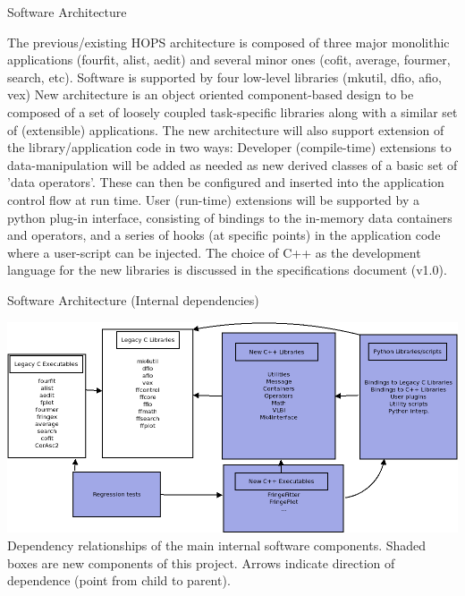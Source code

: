 \documentclass[8pt]{beamer}
\begin{document}
\begin{frame}{Software Architecture}


\begin{outline}
  \1 The previous/existing HOPS architecture is composed of three major monolithic applications (fourfit, alist, aedit) and several minor ones (cofit, average, fourmer, search, etc).
  \1 Software is supported by four low-level libraries (mkutil, dfio, afio, vex)
  \1 New architecture is an object oriented component-based design to be composed of a set of loosely coupled task-specific libraries along with a similar set of (extensible) applications.
  \1 The new architecture will also support extension of the library/application code in two ways:
    \2 Developer (compile-time) extensions to data-manipulation will be added as needed as new derived classes of a basic set of 'data operators'. These can then be configured and inserted into the application control flow at run time.
    \2 User (run-time) extensions will be supported by a python plug-in interface, consisting of bindings to the in-memory data containers and operators, and a series of hooks (at specific points) in the application code where a user-script can be injected.
    \1 The choice of C++ as the development language for the new libraries is discussed in the specifications document (v1.0).
\end{outline}

\end{frame}

\begin{frame}{Software Architecture (Internal dependencies)}


\centering
    \includegraphics[width=\textwidth]{arch_overview.png}
    \vspace{0.75cm} \\
    Dependency relationships of the main internal software components. Shaded boxes are new components of this project. Arrows indicate direction of dependence (point from child to parent).
\end{frame}
\end{document}
